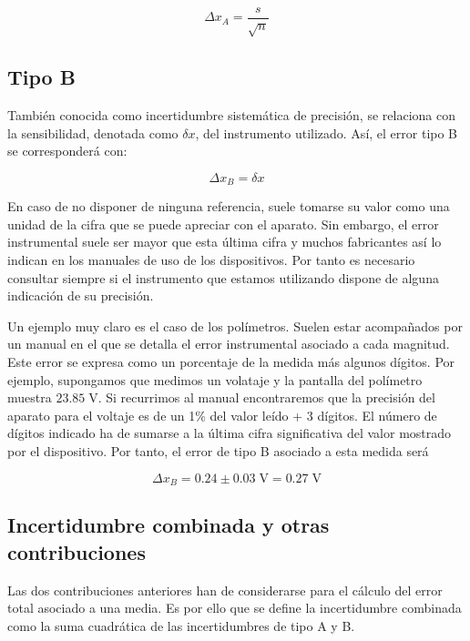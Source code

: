 \documentclass{book}
\begin{document}
\begin{equation}
  \Delta x_A = \frac{s}{\sqrt{n}}
\end{equation}

\subsection{Tipo B}
También conocida como incertidumbre sistemática de precisión, se relaciona con la sensibilidad,
denotada como $\delta x$, del instrumento utilizado. Así, el error tipo B se corresponderá con:

\begin{equation}
  \Delta x_B = \delta x
\end{equation}

En caso de no disponer de ninguna referencia, suele tomarse su valor como una unidad de la cifra 
que se puede apreciar con el aparato. Sin embargo, el error instrumental suele ser mayor que esta 
última cifra y muchos fabricantes así lo indican en los manuales de uso de los dispositivos. Por 
tanto es necesario consultar siempre si el instrumento que estamos utilizando dispone de alguna 
indicación de su precisión.

Un ejemplo muy claro es el caso de los polímetros. Suelen estar acompañados por un manual en
el que se detalla el error instrumental asociado a cada magnitud. Este error se expresa como un
porcentaje de la medida más algunos dígitos. Por ejemplo, supongamos que medimos un volataje y
la pantalla del polímetro muestra $23.85 \; \textrm{V}$. Si recurrimos al manual encontraremos que la precisión
del aparato para el voltaje es de un 1\% del valor leído + 3 dígitos. El número de dígitos indicado
ha de sumarse a la última cifra significativa del valor mostrado por el dispositivo. Por tanto, el error de tipo
B asociado a esta medida será


\begin{equation}
  \Delta x_B = 0.24 \pm 0.03 \; \textrm{V} = 0.27 \; \textrm{V}
\end{equation}

\subsection{Incertidumbre combinada y otras contribuciones}

Las dos contribuciones anteriores han de considerarse para el cálculo del error total asociado a
una media. Es por ello que se define la incertidumbre combinada como la suma cuadrática de las
incertidumbres de tipo A y B.
\end{document}
